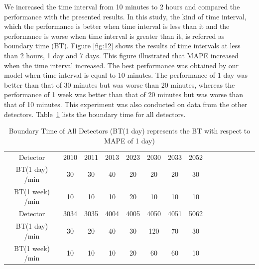 \documentclass[twocolumn]{article}
\begin{document}
\par
We increased the time interval from 10 minutes to 2 hours and compared the performance with the presented results. In this study, the kind of time interval, which the performance is better when time interval is less than it and the performance is worse when time interval is greater than it, is referred as boundary time (BT). Figure \ref{fig:12} shows the results of time intervals at less than 2 hours, 1 day and 7 days.
This figure illustrated that MAPE increased when the time interval increased. The best performance was obtained by our model when time interval is equal to 10 minutes.  The performance of 1 day was better than that of 30 minutes but was worse than 20 minutes, whereas the performance of 1 week was better than that of 20 minutes but was worse than that of 10 minutes. This experiment was also conducted on data from the other detectors. Table~\ref{tab:13} lists the boundary time for all detectors.
\begin{table}
    \centering
    \caption{Boundary Time of All Detectors (BT(1 day) represents the BT with respect to MAPE of 1 day)}
    \begin{tabular}{ccccccccccccccc}
    \toprule
     Detector    & 2010 & 2011 & 2013 & 2023 & 2030 & 2033 & 2052 \\
      BT(1 day) /min  & 30 & 30 & 40 & 20 & 20 & 20 & 30 \\
      BT(1 week) /min & 10 & 10 & 10 & 20 & 10 & 10 & 10\\
      \midrule
     Detector & 3034 & 3035 & 4004 & 4005 & 4050 & 4051 & 5062 \\
     BT(1 day) /min & 30 & 20 & 40 & 30 & 120 & 70 & 30\\
     BT(1 week) /min & 10 & 10 & 10 & 20 & 60 & 60 & 10\\
      \bottomrule
    \end{tabular}
    \label{tab:13}
\end{table}
\end{document}
